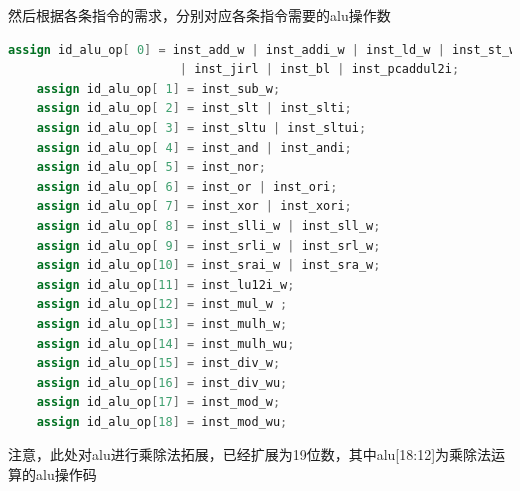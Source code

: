 \documentclass[11pt]{article}
\begin{document}
\begin{enumerate}
  然后根据各条指令的需求，分别对应各条指令需要的alu操作数
  \begin{lstlisting}[language=verilog]
    assign id_alu_op[ 0] = inst_add_w | inst_addi_w | inst_ld_w | inst_st_w  | inst_ld_b | inst_ld_h | inst_ld_bu | inst_ld_hu | inst_st_b | inst_st_h
                        | inst_jirl | inst_bl | inst_pcaddul2i;
    assign id_alu_op[ 1] = inst_sub_w;
    assign id_alu_op[ 2] = inst_slt | inst_slti;
    assign id_alu_op[ 3] = inst_sltu | inst_sltui;
    assign id_alu_op[ 4] = inst_and | inst_andi;
    assign id_alu_op[ 5] = inst_nor;
    assign id_alu_op[ 6] = inst_or | inst_ori;
    assign id_alu_op[ 7] = inst_xor | inst_xori;
    assign id_alu_op[ 8] = inst_slli_w | inst_sll_w;
    assign id_alu_op[ 9] = inst_srli_w | inst_srl_w;
    assign id_alu_op[10] = inst_srai_w | inst_sra_w;
    assign id_alu_op[11] = inst_lu12i_w;
    assign id_alu_op[12] = inst_mul_w ;
    assign id_alu_op[13] = inst_mulh_w;
    assign id_alu_op[14] = inst_mulh_wu;
    assign id_alu_op[15] = inst_div_w;
    assign id_alu_op[16] = inst_div_wu;
    assign id_alu_op[17] = inst_mod_w;
    assign id_alu_op[18] = inst_mod_wu;
  \end{lstlisting}

  注意，此处对alu进行乘除法拓展，已经扩展为19位数，其中alu[18:12]为乘除法运算的alu操作码


\end{enumerate}
\end{document}

